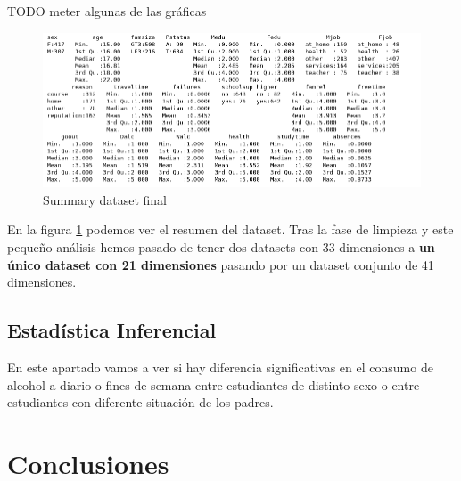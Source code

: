 \documentclass[12pt,a4paper]{article}
\begin{document}
TODO meter algunas de las gráficas 

\begin{figure}[ht!]
	\centering
	\includegraphics[trim = 0mm 0mm 0mm 0mm, clip,scale=0.4]{images/summary_final}
	\caption{Summary dataset final}
	\label{fig:sum4}
\end{figure}


En la figura \ref{fig:sum4} podemos ver el resumen del dataset. Tras la fase de limpieza y este pequeño análisis hemos pasado de tener dos datasets con 33 dimensiones a \textbf{un único dataset con 21 dimensiones} pasando por un dataset conjunto de 41 dimensiones.  



\subsection{ Estadística Inferencial}
En este apartado vamos a ver si hay diferencia significativas en el consumo de alcohol a diario o fines de semana entre estudiantes de distinto sexo o entre estudiantes con diferente situación de los padres. 


\section{Conclusiones}


\newpage
 
 



	
\end{document}
